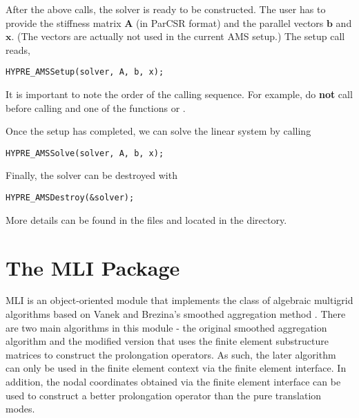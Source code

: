 After the above calls, the solver is ready to be constructed.
The user has to provide the stiffness matrix ${\mathbf A}$ (in ParCSR format) and
the \hypre{} parallel vectors ${\mathbf b}$ and ${\mathbf x}$. (The vectors
are actually not used in the current AMS setup.) The setup call reads,
\begin{display}\begin{verbatim}
HYPRE_AMSSetup(solver, A, b, x);
\end{verbatim}\end{display}
It is important to note the order of the calling sequence. For example, do {\bf not}
call  before calling
and one of the functions
 or .

\noindent
Once the setup has completed, we can solve the linear system by calling
\begin{display}\begin{verbatim}
HYPRE_AMSSolve(solver, A, b, x);
\end{verbatim}\end{display}

\noindent
Finally, the solver can be destroyed with
\begin{display}\begin{verbatim}
HYPRE_AMSDestroy(&solver);
\end{verbatim}\end{display}

\noindent
More details can be found in the files  and 
located in the  directory.


\section{The MLI Package}
                                                                                   
MLI is an object-oriented module that implements the class of algebraic
multigrid algorithms based on Vanek and Brezina's smoothed aggregation
method \cite{VaMB96, VaBM01}.  There are two main algorithms in this module - 
the original
smoothed aggregation algorithm and the modified version that uses
the finite element substructure matrices to construct the prolongation
operators.  As such, the later algorithm can only be used in the
finite element context via the finite element interface.  In addition,
the nodal coordinates obtained via the finite element interface can be
used to construct a better prolongation operator than the pure
translation modes.

